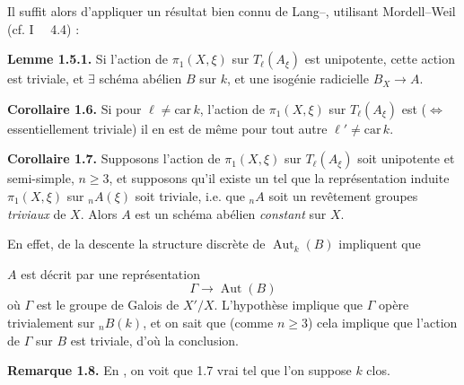 \documentclass[11pt,a4paper]{article}
\begin{document}
Il suffit alors d'appliquer un résultat bien connu de Lang--, \struck{\ill{}} utilisant Mordell--Weil (cf. I~\ill{} \ill{}~4.4) : \struck{\ill{} \ill{} \ill{}}

\textbf{Lemme 1.5.1.} Si l'action de $\pi_1(X,\xi)$ sur $T_\ell(A_\xi)$ est \struck{\ill{}} unipotente, \add{\struck{\ill{} \ill{}}}  cette action est triviale, et $\exists$ schéma abélien $B$ sur $k$, et une isogénie radicielle $B_X \to A$.

\textbf{Corollaire 1.6.}  Si pour  $\ell \neq \mathrm{car}\, k$, l'action de $\pi_1(X,\xi)$ sur $T_\ell(A_\xi)$ est  \struck{\ill{} \ill{}} \struck{\ill{} \ill{}} ($\Leftrightarrow$ \struck{\ill{}} essentiellement triviale) il en est de même pour tout autre $\ell' \neq \mathrm{car}\, k$.

\textbf{Corollaire 1.7.} Supposons   l'action de $\pi_1(X,\xi)$ sur $T_\ell(A_\xi)$ soit unipotente et semi-simple, \struck{\ill{}}  $n \geq 3$, \struck{\ill{} \ill{} \ill{}}  et supposons qu'il existe un \struck{\ill{} \ill{}}  tel que la représentation  induite  $\pi_1(X,\xi)$ sur ${}_nA(\xi)$ soit triviale, i.e. que ${}_nA$ soit un revêtement  groupes \emph{triviaux} de $X$. Alors \struck{\ill{} 1.5 \ill{} \ill{}}  $A$ est un schéma abélien \emph{constant} sur $X$.

En effet,    de la descente    la structure discrète de $\operatorname{Aut}_k(B)$ impliquent que

$A$ est décrit par une représentation
\[
\Gamma \longrightarrow \operatorname{Aut}(B)
\]
où $\Gamma$ est le groupe de Galois de $X'/X$. L'hypothèse implique que $\Gamma$ opère trivialement sur ${}_nB(k)$, et on sait que (comme $n \geq 3$) cela implique que l'action de $\Gamma$ sur $B$ est triviale, d'où la conclusion.

\textbf{Remarque 1.8.}  En , on voit que 1.7  vrai \ill{} \ill{} tel que l'on suppose $k$ \struck{\ill{}}  clos.
\end{document}
